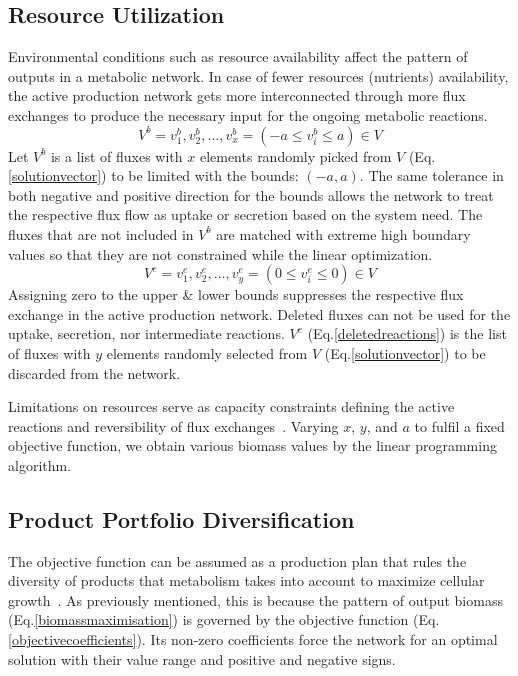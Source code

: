 \subsection*{Resource Utilization}
%
Environmental conditions such as resource availability affect the pattern of outputs in a metabolic network. In case of fewer resources (nutrients) availability, the active production network gets more interconnected through more flux exchanges to produce the necessary input for the ongoing metabolic reactions.~\cite{PRICE2004,MAHADEVAN2003,Reed01092004,BURGARD2001}
\begin{equation} %
	V^{b}={v^{b}_{1}, v^{b}_{2},\dots, v^{b}_{x}}= (-a\le v^{b}_{i}\le a)\in V
	\label{constrainedfluxlist}
\end{equation}
Let $V^{b}$ is a list of fluxes with $x$ elements randomly picked from $V$ (Eq.\eqref{solutionvector}) to be limited with the bounds: $(-a, a)$. The same tolerance in both negative and positive direction for the bounds allows the network to treat the respective flux flow as uptake or secretion based on the system need. The fluxes that are not included in $V^{b}$ are matched with extreme high boundary values so that they are not constrained while the linear optimization.
\begin{equation} %
	V^{e}={v^{e}_{1}, v^{e}_{2},\dots, v^{e}_{y}}= (0\le v^{e}_{i}\le 0)\in V
	\label{deletedreactions}
\end{equation}
Assigning zero to the upper \& lower bounds suppresses the respective flux exchange in the active production network. Deleted fluxes can not be used for the uptake, secretion, nor intermediate reactions. $V^{e}$ (Eq.\eqref{deletedreactions}) is the list of fluxes with $y$ elements randomly selected from $V$ (Eq.\eqref{solutionvector}) to be discarded from the network.

Limitations on resources serve as capacity constraints defining the active reactions and reversibility of flux exchanges~\cite{Edwards2001}. Varying $x$, $y$, and $a$ to fulfil a fixed objective function, we obtain various biomass values by the linear programming algorithm.

\subsection*{Product Portfolio Diversification}
%
The objective function can be assumed as a production plan that rules the diversity of products that metabolism takes into account to maximize cellular growth~\cite{Edwards2001}. As previously mentioned, this is because the pattern of output biomass (Eq.\eqref{biomassmaximisation}) is governed by the objective function (Eq.\eqref{objectivecoefficients}). Its non-zero coefficients force the network for an optimal solution with their value range and positive and negative signs.    

